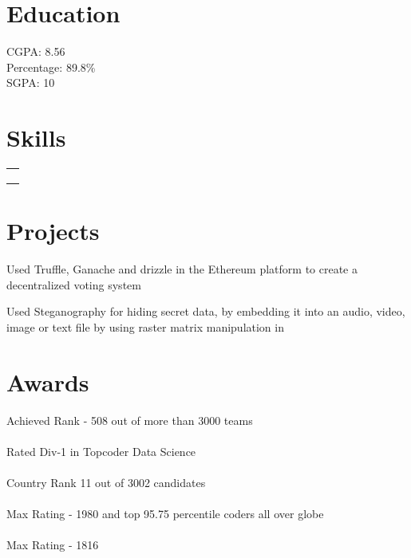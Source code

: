 \documentclass[10pt]{article}
\date{\vspace{-5ex}}
\begin{document}

\section{Education}

\raggedright

CGPA: 8.56\\

Percentage: 89.8\%\\

SGPA: 10\\

\section{Skills}

\raggedright

\begin{longtable}[]{@{}l@{}}
\toprule
\begin{minipage}[t]{0.97\columnwidth}\raggedright
\strut
\end{minipage}\tabularnewline
\begin{minipage}[t]{0.97\columnwidth}\raggedright
\strut
\end{minipage}\tabularnewline
\begin{minipage}[t]{0.97\columnwidth}\raggedright
\strut
\end{minipage}\tabularnewline
\bottomrule
\end{longtable}

\sectionsep

\section{Projects}

\raggedright


Used Truﬄe, Ganache and drizzle in the Ethereum platform to create a
decentralized voting system\\


Used Steganography for hiding secret data, by embedding it into an
audio, video, image or text file by using raster matrix manipulation
in\\

\section{Awards}

Achieved Rank - 508 out of more than 3000 teams\\
~\\
Rated Div-1 in Topcoder Data Science\\
~\\
Country Rank 11 out of 3002 candidates\\
~\\
Max Rating - 1980 and top 95.75 percentile coders all over globe\\
~\\
Max Rating - 1816\\
\hspace*{0.333em}
\end{document}
